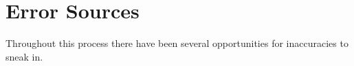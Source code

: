 \section{Error Sources}

Throughout this process there have been several opportunities for inaccuracies to sneak in. 

\TODO
